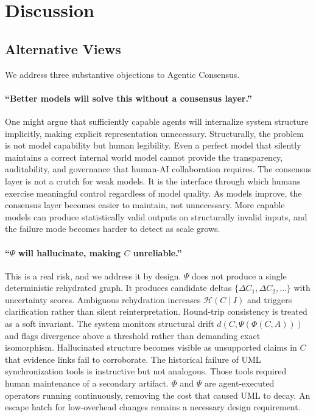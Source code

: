 
\section{Discussion}

\subsection{Alternative Views}
We address three substantive objections to Agentic Consensus.

\paragraph{``Better models will solve this without a consensus layer.''}
One might argue that sufficiently capable agents will internalize system structure implicitly, making explicit representation unnecessary.
Structurally, the problem is not model capability but human legibility. Even a perfect model that silently maintains a correct internal world model cannot provide the transparency, auditability, and governance that human-AI collaboration requires.
The consensus layer is not a crutch for weak models. It is the interface through which humans exercise meaningful control regardless of model quality.
As models improve, the consensus layer becomes easier to maintain, not unnecessary.
More capable models can produce statistically valid outputs on structurally invalid inputs, and the failure mode becomes harder to detect as scale grows.

\paragraph{``$\Psi$ will hallucinate, making $C$ unreliable.''}
This is a real risk, and we address it by design.
$\Psi$ does not produce a single deterministic rehydrated graph. It produces candidate deltas $\{\Delta C_1, \Delta C_2, \ldots\}$ with uncertainty scores.
Ambiguous rehydration increases $\mathcal{H}(C \mid I)$ and triggers clarification rather than silent reinterpretation.
Round-trip consistency is treated as a soft invariant. The system monitors structural drift $d(C, \Psi(\Phi(C, A)))$ and flags divergence above a threshold rather than demanding exact isomorphism.
Hallucinated structure becomes visible as unsupported claims in $C$ that evidence links fail to corroborate.
The historical failure of UML synchronization tools is instructive but not analogous. Those tools required human maintenance of a secondary artifact. $\Phi$ and $\Psi$ are agent-executed operators running continuously, removing the cost that caused UML to decay.
An escape hatch for low-overhead changes remains a necessary design requirement.

